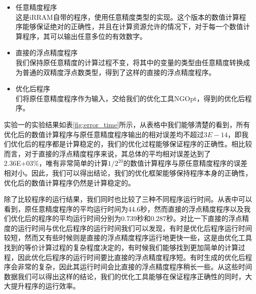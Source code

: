 \begin{itemize}
    \item {\kaishu 任意精度程序} \\
    这是iRRAM自带的程序，使用任意精度类型的实现。这个版本的数值计算程序能够保证绝对的正确性，并且在计算资源允许的情况下，对于每一个数值计算程序，其可以输出任意多位的有效数字。

    \item {\kaishu 直接的浮点精度程序} \\
    我们保持原任意精度的计算过程不变，将其中的变量的类型由任意精度转换成为普通的双精度浮点数类型，得到了这样的直接的浮点精度程序。

    \item {\kaishu 优化后程序} \\
    们将原任意精度程序作为输入，交给我们的优化工具NGOpt，得到的优化后程序。
\end{itemize}

实验一的实验结果如表\ref{fig:error_time}所示，从表格中我们能够清楚的看到，所有优化后的数值计算程序与原任意精度程序输出的相对误差均不超过$3E-14$，即我们优化后的程序都是计算稳定的，我们的优化过程能够保证程序的正确性。相比较而言，对于直接的浮点精度程序来说，其总体的平均相对误差达到了2.36E+03\%，唯有非常简单的计算$1/2^{20}$的数值计算程序与原任意精度程序的误差相对小。因此，我们可以得出结论，我们的优化框架能够保持程序本身的正确性，优化后的数值计算程序仍然是计算稳定的。

除了比较程序的运行结果，我们同时也比较了三种不同程序运行时间。从表中可以看到，原任意精度程序的平均运行时间为44.6秒，然而直接的浮点精度程序以及我们优化后的程序的平均运行时间分别为0.739秒和0.287秒。对比一下直接的浮点精度的运行时间与优化后程序的运行时间我们可以发现，有时是优化后程序运行时间较短，然而又有些时候则是直接的浮点精度程序运行地更快一些，这是由优化工具找到的等价计算过程的复杂程度决定的，有时候我们能够找到更加简单的计算过程，因此优化后程序的运行时间要比直接的浮点精度程序短。有时生成的优化后程序会非常的复杂，因此其运行时间会比直接的浮点精度程序稍长一些。从这些时间数据我们可以得出这样的结论，我们的优化工具能够在保证程序正确性的同时，大大提升程序的运行效率。

